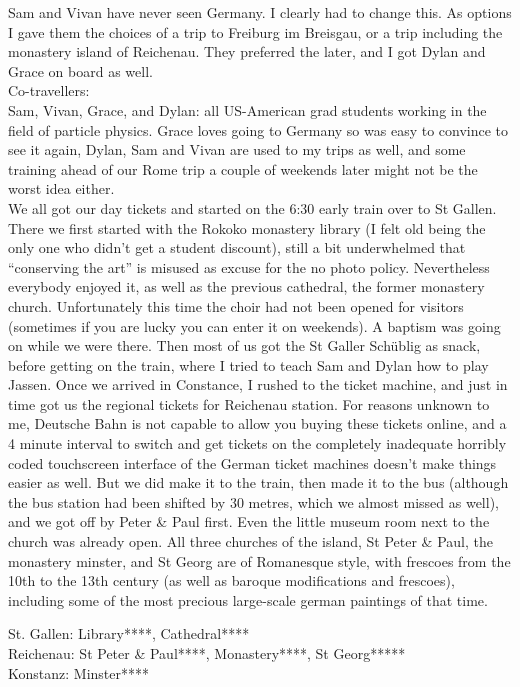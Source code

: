 Sam and Vivan have never seen Germany. I clearly had to change this. As options I gave them the choices of a trip to Freiburg im Breisgau, or a trip including the monastery island of Reichenau. They preferred the later, and I got Dylan and Grace on board as well.\\

Co-travellers:\\
Sam, Vivan, Grace, and Dylan: all US-American grad students working in the field of particle physics. Grace loves going to Germany so was easy to convince to see it again, Dylan, Sam and Vivan are used to my trips as well, and some training ahead of our Rome trip a couple of weekends later might not be the worst idea either.\\

We all got our day tickets and started on the 6:30 early train over to St Gallen. There we first started with the Rokoko monastery library (I felt old being the only one who didn't get a student discount), still a bit underwhelmed that ``conserving the art'' is misused as excuse for the no photo policy. Nevertheless everybody enjoyed it, as well as the previous cathedral, the former monastery church. Unfortunately this time the choir had not been opened for visitors (sometimes if you are lucky you can enter it on weekends). A baptism was going on while we were there. Then most of us got the St Galler Sch\"ublig as snack, before getting on the train, where I tried to teach Sam and Dylan how to play Jassen. Once we arrived in Constance, I rushed to the ticket machine, and just in time got us the regional tickets for Reichenau station. For reasons unknown to me, Deutsche Bahn is not capable to allow you buying these tickets online, and a 4 minute interval to switch and get tickets on the completely inadequate horribly coded touchscreen interface of the German ticket machines doesn't make things easier as well. But we did make it to the train, then made it to the bus (although the bus station had been shifted by 30 metres, which we almost missed as well), and we got off by Peter \& Paul first. Even the little museum room next to the church was already open. All three churches of the island, St Peter \& Paul, the monastery minster, and St Georg are of Romanesque style, with frescoes from the 10th to the 13th century (as well as baroque modifications and frescoes), including some of the most precious large-scale german paintings of that time.

St. Gallen: Library****, Cathedral****\\
Reichenau: St Peter \& Paul****, Monastery****, St Georg*****\\
Konstanz: Minster****

